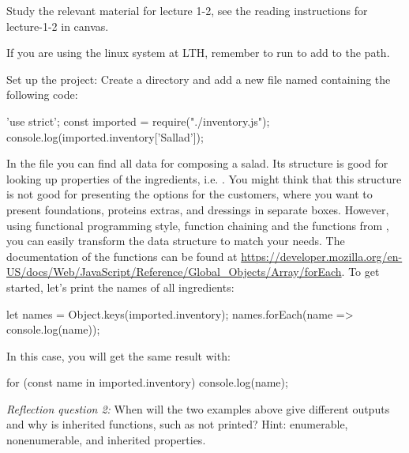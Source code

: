 \documentclass[fleqn, article, a4paper]{memoir}
\begin{document}
\begin{Assignments}

\item Study the relevant material for lecture 1-2, see the reading instructions for lecture-1-2 in canvas. 

\item If you are using the linux system at LTH, remember to run  to add  to the path.

\item %
Set up the project: Create a directory and add a new file named  containing the following code:
\begin{Code}
'use strict';
const imported = require("./inventory.js");
console.log(imported.inventory['Sallad']);
\end{Code}



\item In the  file you can find all data for composing a salad. Its structure is good for looking up properties of the ingredients, i.e. . You might think that this structure is not good for presenting the options for the customers, where you want to present foundations, proteins extras, and dressings in separate boxes. However, using functional programming style, function chaining and the functions from , you can easily transform the data structure to match your needs. The documentation of the functions can be found at \url{https://developer.mozilla.org/en-US/docs/Web/JavaScript/Reference/Global_Objects/Array/forEach}. To get started, let's print the names of all ingredients:
\begin{Code}
let names = Object.keys(imported.inventory);
names.forEach(name => console.log(name));
\end{Code}
In this case, you will get the same result with:
\begin{Code}
for (const name in imported.inventory) {
  console.log(name);
}
\end{Code}
\emph{Reflection question 2:} When will the two examples above give different outputs and why is inherited functions, such as  not printed? Hint: enumerable, nonenumerable, and inherited properties.


\end{Assignments}
\end{document}
